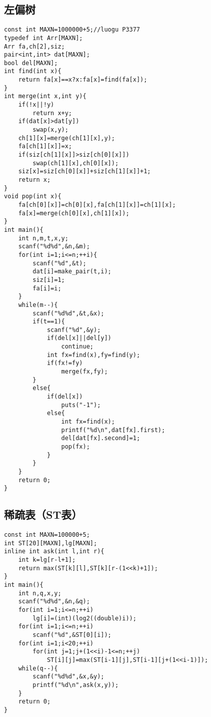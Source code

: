 \documentclass[UTF8]{ctexart}
\begin{document}
\subsection{左偏树}
\begin{lstlisting}
const int MAXN=1000000+5;//luogu P3377
typedef int Arr[MAXN];
Arr fa,ch[2],siz;
pair<int,int> dat[MAXN];
bool del[MAXN];
int find(int x){
    return fa[x]==x?x:fa[x]=find(fa[x]);
}
int merge(int x,int y){
    if(!x||!y)
        return x+y;
    if(dat[x]>dat[y])
        swap(x,y);
    ch[1][x]=merge(ch[1][x],y);
    fa[ch[1][x]]=x;
    if(siz[ch[1][x]]>siz[ch[0][x]])	
        swap(ch[1][x],ch[0][x]);	
    siz[x]=siz[ch[0][x]]+siz[ch[1][x]]+1;
    return x;	
}
void pop(int x){
    fa[ch[0][x]]=ch[0][x],fa[ch[1][x]]=ch[1][x];
    fa[x]=merge(ch[0][x],ch[1][x]);
}
int main(){
    int n,m,t,x,y;
    scanf("%d%d",&n,&m);
    for(int i=1;i<=n;++i){
        scanf("%d",&t);
        dat[i]=make_pair(t,i);
        siz[i]=1;
        fa[i]=i;
    }
    while(m--){
        scanf("%d%d",&t,&x);
        if(t==1){
            scanf("%d",&y);
            if(del[x]||del[y])
                continue;
            int fx=find(x),fy=find(y);
            if(fx!=fy)
                merge(fx,fy);
        }
        else{
            if(del[x])
                puts("-1");
            else{
                int fx=find(x);
                printf("%d\n",dat[fx].first);
                del[dat[fx].second]=1;
                pop(fx);
            }
        }
    }
    return 0;
} 
\end{lstlisting}
\subsection{稀疏表（ST表）}
\begin{lstlisting}
const int MAXN=100000+5;
int ST[20][MAXN],lg[MAXN];
inline int ask(int l,int r){
	int k=lg[r-l+1];
	return max(ST[k][l],ST[k][r-(1<<k)+1]);
}
int main(){
	int n,q,x,y;
	scanf("%d%d",&n,&q);
	for(int i=1;i<=n;++i)
		lg[i]=(int)(log2((double)i));
	for(int i=1;i<=n;++i)
		scanf("%d",&ST[0][i]);
	for(int i=1;i<20;++i)
		for(int j=1;j+(1<<i)-1<=n;++j)
			ST[i][j]=max(ST[i-1][j],ST[i-1][j+(1<<i-1)]);
	while(q--){
		scanf("%d%d",&x,&y);
		printf("%d\n",ask(x,y));
	}
	return 0;
}
\end{lstlisting}
\end{document}
